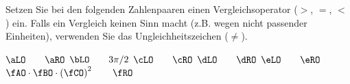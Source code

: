 Setzen Sie bei den folgenden Zahlenpaaren einen Vergleichsoperator ($>$, $=$, $<$) ein. Falls ein Vergleich keinen Sinn macht (z.B. wegen nicht passender Einheiten), verwenden Sie das Ungleichheitszeichen ($\neq$).

\begin{abcliste}
\abc $\aLO \qquad \aRO$
\abc $\bLO \qquad 3\pi/2$
\abc $\cLO \qquad \cRO$
\abc $\dLO \qquad \dRO$
\abc $\eLO \qquad \eRO$
\abc $\fAO\cdot\fBO\cdot\left(\fCO\right)^2 \qquad \fRO$
\end{abcliste}
